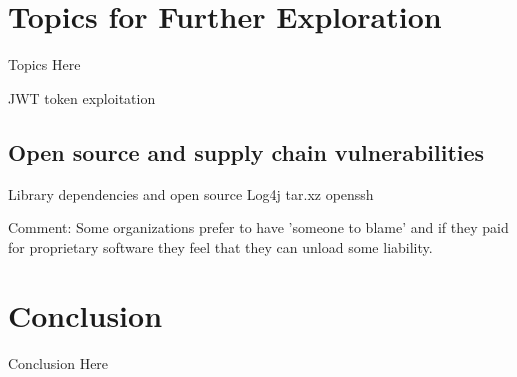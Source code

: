 \documentclass[
	letterpaper, %
	10pt, %
	unnumberedsections, %
	twoside, %
]{APAAssignment}
\begin{document}
\section{Topics for Further Exploration}
Topics Here

JWT token exploitation


\subsection{Open source and supply chain vulnerabilities}
Library dependencies and open source
Log4j
tar.xz
openssh

Comment:
Some organizations prefer to have 'someone to blame' and if they paid for proprietary software they feel that they can unload some liability.


\section{Conclusion}
Conclusion Here

\clearpage
\printbibliography %





\appendix


\clearpage
\end{document}
